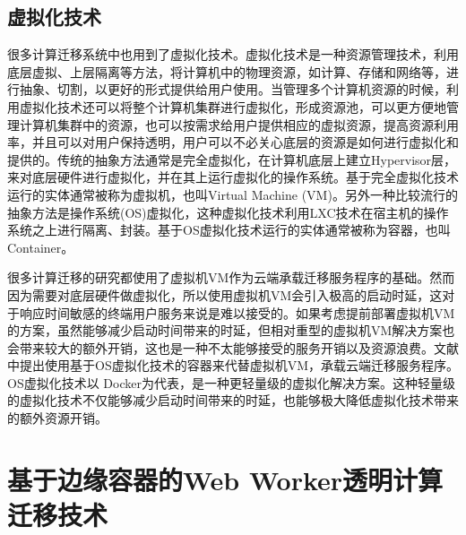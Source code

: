 \subsection{虚拟化技术}

很多计算迁移系统中也用到了虚拟化技术。虚拟化技术是一种资源管理技术，利用底层虚拟、上层隔离等方法，将计算机中的物理资源，如计算、存储和网络等，进行抽象、切割，以更好的形式提供给用户使用\cite{goth2007virtualization}。当管理多个计算机资源的时候，利用虚拟化技术还可以将整个计算机集群进行虚拟化，形成资源池，可以更方便地管理计算机集群中的资源，也可以按需求给用户提供相应的虚拟资源，提高资源利用率，并且可以对用户保持透明，用户可以不必关心底层的资源是如何进行虚拟化和提供的。传统的抽象方法通常是完全虚拟化，在计算机底层上建立Hypervisor层，来对底层硬件进行虚拟化，并在其上运行虚拟化的操作系统。基于完全虚拟化技术运行的实体通常被称为虚拟机，也叫Virtual Machine (VM)。另外一种比较流行的抽象方法是操作系统(OS)虚拟化，这种虚拟化技术利用LXC技术在宿主机的操作系统之上进行隔离、封装。基于OS虚拟化技术运行的实体通常被称为容器，也叫Container。

很多计算迁移的研究\cite{chae2014cmcloud,chun2011clonecloud,kosta2012thinkair,shi2014cosmos}都使用了虚拟机VM作为云端承载迁移服务程序的基础。然而因为需要对底层硬件做虚拟化，所以使用虚拟机VM会引入极高的启动时延，这对于响应时间敏感的终端用户服务来说是难以接受的。如果考虑提前部署虚拟机VM的方案，虽然能够减少启动时间带来的时延，但相对重型的虚拟机VM解决方案也会带来较大的额外开销，这也是一种不太能够接受的服务开销以及资源浪费\cite{ismail2015evaluation}。文献\cite{wu2017container}中提出使用基于OS虚拟化技术的容器来代替虚拟机VM，承载云端迁移服务程序。OS虚拟化技术以 Docker为代表，是一种更轻量级的虚拟化解决方案\cite{陈霄2017基于}。这种轻量级的虚拟化技术不仅能够减少启动时间带来的时延，也能够极大降低虚拟化技术带来的额外资源开销。

\section{基于边缘容器的Web Worker透明计算迁移技术}\label{sec:computation_offloading_system_design}

